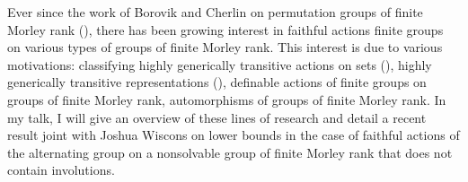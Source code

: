 \documentclass[bsl,meeting]{asl}
\newcommand{\NP}{}
\begin{document}
\thispagestyle{empty}


\NP  
{}

Ever since the work of Borovik and Cherlin on permutation groups of finite Morley rank (\cite{BoCh08}), there has been growing
interest in faithful actions finite groups on various types of groups of finite Morley rank. This interest is due to various
motivations: classifying highly generically transitive actions on sets (\cite{AW}), highly generically transitive representations (\cite{}), 
definable actions of finite groups on groups of finite Morley rank, automorphisms of groups of finite Morley rank. In my talk,
I will give an overview of these lines of research and detail a recent result joint with Joshua Wiscons on lower bounds in the
case of faithful actions of the alternating group on a nonsolvable group of finite Morley rank that does not contain involutions.
\end{document}
